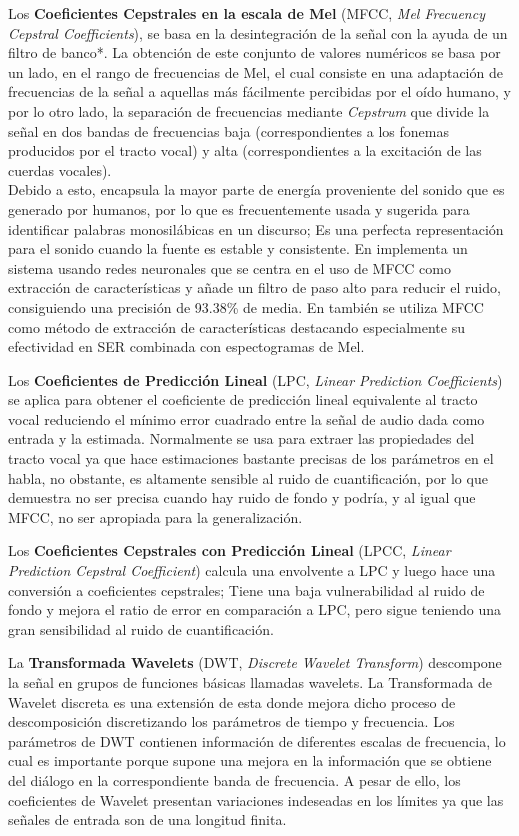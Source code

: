 \documentclass[11pt,a4paper,spanish]{book}
\begin{document}
	Los \textbf{Coeficientes Cepstrales en la escala de Mel} (MFCC, \emph{Mel Frecuency Cepstral Coefficients}), se basa en la desintegración de la señal con la ayuda de un filtro de banco*. La obtención de este conjunto de valores numéricos se basa por un lado, en el rango de frecuencias de Mel, el cual consiste en una adaptación de frecuencias de la señal a aquellas más fácilmente percibidas por el oído humano, y por lo otro lado, la separación de frecuencias mediante \emph{Cepstrum} que divide la señal en dos bandas de frecuencias baja (correspondientes a los fonemas producidos por el tracto vocal) y alta (correspondientes a la excitación de las cuerdas vocales).\\
	Debido a esto, encapsula la mayor parte de energía proveniente del sonido que es generado por humanos, por lo que es frecuentemente usada y sugerida para identificar palabras monosilábicas en un discurso; Es una perfecta representación para el sonido cuando la fuente es estable y consistente. En \cite{Sarkania2013} implementa un sistema usando redes neuronales que se centra en el uso de MFCC como extracción de características y añade un filtro  de paso alto para reducir el ruido, consiguiendo una precisión de 93.38\% de media. En \cite{Wang2020} también se utiliza MFCC como método de extracción de características destacando especialmente su efectividad en SER combinada con espectogramas de Mel.\hfill \break
	
	Los \textbf{Coeficientes de Predicción Lineal} (LPC, \emph{Linear Prediction Coefficients}) se aplica para obtener el coeficiente de predicción lineal equivalente al tracto vocal reduciendo el mínimo error cuadrado entre la señal de audio dada como entrada y la estimada. Normalmente se usa para extraer las propiedades del tracto vocal ya que hace estimaciones bastante precisas de los parámetros en el habla, no obstante, es altamente sensible al ruido de cuantificación, por lo que demuestra no ser precisa cuando hay ruido de fondo y podría, y al igual que MFCC, no ser apropiada para la generalización.\hfill \break
	
	 Los \textbf{Coeficientes Cepstrales con Predicción Lineal} (LPCC, \emph{Linear Prediction Cepstral Coefficient}) calcula una envolvente a LPC y luego hace una conversión a coeficientes cepstrales; Tiene una baja vulnerabilidad al ruido de fondo y mejora el ratio de error en comparación a LPC, pero sigue teniendo una gran sensibilidad al ruido de cuantificación.\hfill \break
	
	La \textbf{Transformada Wavelets} (DWT, \emph{Discrete Wavelet Transform}) descompone la señal en grupos de funciones básicas llamadas wavelets. La Transformada de Wavelet discreta es una extensión de esta donde mejora dicho proceso de descomposición discretizando los parámetros de tiempo y frecuencia. Los parámetros de DWT contienen información de diferentes escalas de frecuencia, lo cual es importante porque supone una mejora en la información que se obtiene del diálogo en la correspondiente banda de frecuencia. A pesar de ello, los coeficientes de Wavelet presentan variaciones indeseadas en los límites ya que las señales de entrada son de una longitud finita.\hfill \break
\end{document}
